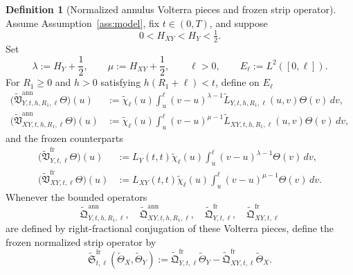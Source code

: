 \documentclass[11pt,a4paper]{amsart}
\theoremstyle{plain}
\theoremstyle{definition}
\newtheorem{definition}[theorem]{Definition}
\theoremstyle{remark}
\begin{document}
\begin{definition}[Normalized annulus Volterra pieces and frozen strip operator]
\label{def:annulus-conjugated}
Assume Assumption~\ref{ass:model}, fix \(t\in(0,T)\), and suppose
\[
0<H_{XY}<H_Y<\tfrac12.
\]
Set
\[
\lambda:=H_Y+\frac12,
\qquad
\mu:=H_{XY}+\frac12,
\qquad
\ell>0,
\qquad
E_\ell:=L^2([0,\ell]).
\]
For \(R_1\ge0\) and \(h>0\) satisfying \(h(R_1+\ell)<t\), define on \(E_\ell\)
\begin{align}
\bigl(
\widetilde{\mathfrak V}_{Y,t,h,R_1,\ell}^{\mathrm{ann}}\Theta
\bigr)(u)
&:=
\widetilde\chi_\ell(u)
\int_u^\ell
(v-u)^{\lambda-1}
\widetilde L_{Y,t,h,R_1,\ell}(u,v)\Theta(v)\,dv,
\label{eq:annulus-VY}\\
\bigl(
\widetilde{\mathfrak V}_{XY,t,h,R_1,\ell}^{\mathrm{ann}}\Theta
\bigr)(u)
&:=
\widetilde\chi_\ell(u)
\int_u^\ell
(v-u)^{\mu-1}
\widetilde L_{XY,t,h,R_1,\ell}(u,v)\Theta(v)\,dv,
\label{eq:annulus-VXY}
\end{align}
and the frozen counterparts
\begin{align}
\bigl(
\widetilde{\mathfrak V}_{Y,t,\ell}^{\mathrm{fr}}\Theta
\bigr)(u)
&:=
L_Y(t,t)\widetilde\chi_\ell(u)
\int_u^\ell
(v-u)^{\lambda-1}\Theta(v)\,dv,
\label{eq:annulus-VY-fr}\\
\bigl(
\widetilde{\mathfrak V}_{XY,t,\ell}^{\mathrm{fr}}\Theta
\bigr)(u)
&:=
L_{XY}(t,t)\widetilde\chi_\ell(u)
\int_u^\ell
(v-u)^{\mu-1}\Theta(v)\,dv.
\label{eq:annulus-VXY-fr}
\end{align}
Whenever the bounded operators
\[
\widetilde{\mathfrak Q}_{Y,t,h,R_1,\ell}^{\mathrm{ann}},
\quad
\widetilde{\mathfrak Q}_{XY,t,h,R_1,\ell}^{\mathrm{ann}},
\quad
\widetilde{\mathfrak Q}_{Y,t,\ell}^{\mathrm{fr}},
\quad
\widetilde{\mathfrak Q}_{XY,t,\ell}^{\mathrm{fr}}
\]
are defined by right-fractional conjugation of these Volterra pieces, define the frozen normalized
strip operator by
\begin{equation}\label{eq:annulus-S-fr}
\widetilde{\mathfrak S}_{t,\ell}^{\mathrm{fr}}
(\widetilde\Theta_X,\widetilde\Theta_Y)
:=
\widetilde{\mathfrak Q}_{Y,t,\ell}^{\mathrm{fr}}\widetilde\Theta_Y
-
\widetilde{\mathfrak Q}_{XY,t,\ell}^{\mathrm{fr}}\widetilde\Theta_X.
\end{equation}
\end{definition}
\end{document}
